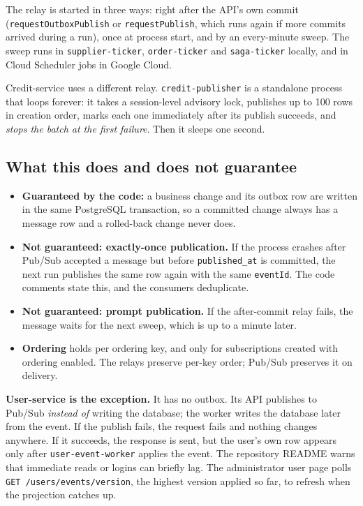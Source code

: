 \documentclass[11pt,a4paper]{article}
\newcommand{\code}[1]{\nolinkurl{#1}}
\begin{document}
The relay is started in three ways: right after the API's own commit
(\code{requestOutboxPublish} or \code{requestPublish}, which runs again if more commits
arrived during a run), once at process start, and by an every-minute sweep. The sweep
runs in \code{supplier-ticker}, \code{order-ticker} and \code{saga-ticker} locally, and in
Cloud Scheduler jobs in Google Cloud.

Credit-service uses a different relay. \code{credit-publisher} is a standalone process
that loops forever: it takes a session-level advisory lock, publishes up to 100 rows in
creation order, marks each one immediately after its publish succeeds, and \emph{stops
the batch at the first failure}. Then it sleeps one second.

\subsection{What this does and does not guarantee}

\begin{itemize}
  \item \textbf{Guaranteed by the code:} a business change and its outbox row are written
  in the same PostgreSQL transaction, so a committed change always has a message row and
  a rolled-back change never does.
  \item \textbf{Not guaranteed: exactly-once publication.} If the process crashes after
  Pub/Sub accepted a message but before \code{published_at} is committed, the next run
  publishes the same row again with the same \code{eventId}. The code comments state
  this, and the consumers deduplicate.
  \item \textbf{Not guaranteed: prompt publication.} If the after-commit relay fails,
  the message waits for the next sweep, which is up to a minute later.
  \item \textbf{Ordering} holds per ordering key, and only for subscriptions created with
  ordering enabled. The relays preserve per-key order; Pub/Sub preserves it on delivery.
\end{itemize}

\textbf{User-service is the exception.} It has no outbox. Its API publishes to Pub/Sub
\emph{instead of} writing the database; the worker writes the database later from the
event. If the publish fails, the request fails and nothing changes anywhere. If it
succeeds, the response is sent, but the user's own row appears only after
\code{user-event-worker} applies the event. The repository README warns that immediate
reads or logins can briefly lag. The administrator user page polls
\code{GET /users/events/version}, the highest version applied so far, to refresh when
the projection catches up.
\end{document}
